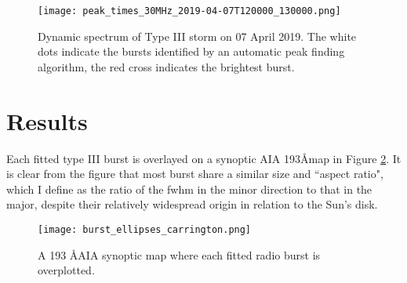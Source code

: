 \begin{figure}
\centering
\texttt{[image: peak\_times\_30MHz\_2019-04-07T120000\_130000.png]}
\caption[Dynamic spectrum of Type III storm on 07 April 2019.]{Dynamic spectrum of Type III storm on 07 April 2019. The white dots indicate the bursts identified by an automatic peak finding algorithm, the red cross indicates the brightest burst.}
\label{fig:dynamic_spectrum_070419}
\end{figure}

\section{Results}
\label{sec:obsvtheory_results}
Each fitted type III burst is overlayed on a synoptic AIA 193\AA  map in Figure \ref{fig:synoptic_bursts}. It is clear from the figure that most burst share a similar size and ``aspect ratio", which I define as the ratio of the fwhm in the minor direction to that in the major, despite their relatively widespread origin in relation to the Sun's disk.

\begin{figure}
\centering
\texttt{[image: burst\_ellipses\_carrington.png]}
\caption[Synoptic AIA 193\AA  map overlayed with Type III radio bursts.]{A 193 \AA  AIA synoptic map where each fitted radio burst is overplotted. }
\label{fig:synoptic_bursts}
\end{figure}

